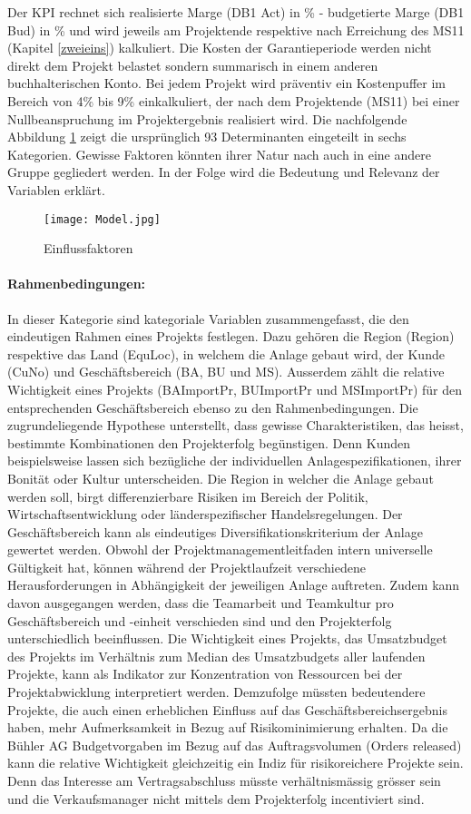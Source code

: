 Der KPI rechnet sich realisierte Marge (DB1 Act) in \% - budgetierte Marge (DB1 Bud) in \% und wird jeweils am Projektende respektive nach Erreichung des MS11 (Kapitel \ref{zweieins}) kalkuliert. Die Kosten der Garantieperiode werden nicht direkt dem Projekt belastet sondern summarisch in einem anderen buchhalterischen Konto. Bei jedem Projekt wird präventiv ein Kostenpuffer im Bereich von 4\% bis 9\% einkalkuliert, der nach dem Projektende (MS11) bei einer Nullbeanspruchung im Projektergebnis realisiert wird.
\newline Die nachfolgende Abbildung \ref{Einflussfaktoren} zeigt die ursprünglich 93 Determinanten eingeteilt in sechs Kategorien. Gewisse Faktoren könnten ihrer Natur nach auch in eine andere Gruppe gegliedert werden. In der Folge wird die Bedeutung und Relevanz der Variablen erklärt.
\begin{figure}[H]
	\centering
	\texttt{[image: Model.jpg]}
	\caption{Einflussfaktoren
	\label{Einflussfaktoren}}
\end{figure}
\paragraph{Rahmenbedingungen:} In dieser Kategorie sind kategoriale Variablen zusammengefasst, die den eindeutigen Rahmen eines Projekts festlegen. Dazu gehören die Region (Region) respektive das Land (EquLoc), in welchem die Anlage gebaut wird, der Kunde (CuNo) und Geschäftsbereich (BA, BU und MS). Ausserdem zählt die relative Wichtigkeit eines Projekts (BAImportPr, BUImportPr und MSImportPr) für den entsprechenden Geschäftsbereich ebenso zu den Rahmenbedingungen. Die zugrundeliegende Hypothese unterstellt, dass gewisse Charakteristiken, das heisst, bestimmte Kombinationen den Projekterfolg begünstigen. Denn Kunden beispielsweise lassen sich bezügliche der individuellen Anlagespezifikationen, ihrer Bonität oder Kultur unterscheiden. Die Region in welcher die Anlage gebaut werden soll, birgt differenzierbare Risiken im Bereich der Politik, Wirtschaftsentwicklung oder länderspezifischer Handelsregelungen. Der Geschäftsbereich kann als eindeutiges Diversifikationskriterium der Anlage gewertet werden. Obwohl der Projektmanagementleitfaden intern universelle Gültigkeit hat, können während der Projektlaufzeit verschiedene Herausforderungen in Abhängigkeit der jeweiligen Anlage auftreten. Zudem kann davon ausgegangen werden, dass die Teamarbeit und Teamkultur pro Geschäftsbereich und -einheit verschieden sind und den Projekterfolg unterschiedlich beeinflussen. Die Wichtigkeit eines Projekts, das Umsatzbudget des Projekts im Verhältnis zum Median des Umsatzbudgets aller laufenden Projekte, kann als Indikator zur Konzentration von Ressourcen bei der Projektabwicklung interpretiert werden. Demzufolge müssten bedeutendere Projekte, die auch einen erheblichen Einfluss auf das Geschäftsbereichsergebnis haben, mehr Aufmerksamkeit in Bezug auf Risikominimierung erhalten. Da die Bühler AG Budgetvorgaben im Bezug auf das Auftragsvolumen (Orders released) kann die relative Wichtigkeit gleichzeitig ein Indiz für risikoreichere Projekte sein. Denn das Interesse am Vertragsabschluss müsste verhältnismässig grösser sein und die Verkaufsmanager nicht mittels dem Projekterfolg incentiviert sind.
